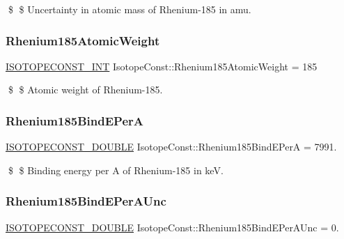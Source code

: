 \$ \$ Uncertainty in atomic mass of Rhenium-\/185 in amu. \mbox{\label{group___isotope_const-_rhenium-_re185_gafed7cccea3efc599693f39596dce89bb}} 
\subsubsection{\texorpdfstring{Rhenium185\+Atomic\+Weight}{Rhenium185AtomicWeight}}
{\footnotesize\ttfamily \mbox{\hyperlink{group___isotope_const-_macros_ga5f18360b3e99483a35c32d789e62621c}{I\+S\+O\+T\+O\+P\+E\+C\+O\+N\+S\+T\+\_\+\+I\+NT}} Isotope\+Const\+::\+Rhenium185\+Atomic\+Weight = 185}

\$ \$ Atomic weight of Rhenium-\/185. \mbox{\label{group___isotope_const-_rhenium-_re185_ga6d70d30b926e43e721f7f6263ba4c7be}} 
\subsubsection{\texorpdfstring{Rhenium185\+Bind\+E\+PerA}{Rhenium185BindEPerA}}
{\footnotesize\ttfamily \mbox{\hyperlink{group___isotope_const-_macros_ga8f45a7272ce02c0b4c65c44636ed719a}{I\+S\+O\+T\+O\+P\+E\+C\+O\+N\+S\+T\+\_\+\+D\+O\+U\+B\+LE}} Isotope\+Const\+::\+Rhenium185\+Bind\+E\+PerA = 7991.}

\$ \$ Binding energy per A of Rhenium-\/185 in keV. \mbox{\label{group___isotope_const-_rhenium-_re185_ga3730da2941d9d2c1f50a68c59484d3eb}} 
\subsubsection{\texorpdfstring{Rhenium185\+Bind\+E\+Per\+A\+Unc}{Rhenium185BindEPerAUnc}}
{\footnotesize\ttfamily \mbox{\hyperlink{group___isotope_const-_macros_ga8f45a7272ce02c0b4c65c44636ed719a}{I\+S\+O\+T\+O\+P\+E\+C\+O\+N\+S\+T\+\_\+\+D\+O\+U\+B\+LE}} Isotope\+Const\+::\+Rhenium185\+Bind\+E\+Per\+A\+Unc = 0.}

